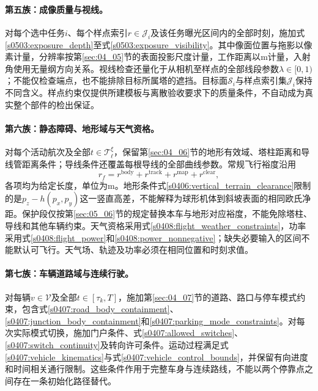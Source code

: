 \paragraph{第五族：成像质量与视线。}
对每个选中任务$i$、每个样点索引$r\in\mathcal J_i$及该任务曝光区间内的全部时刻，施加式\eqref{s0503:exposure_depth}至式\eqref{s0503:exposure_visibility}。其中像面位置与拖影以像素计量，分辨率按第\ref{sec:04_05}节的表面投影尺度计量，工作距离以$\mathrm m$计量，入射角使用无量纲方向关系。视线检查还量化于从相机至样点的全部线段参数$\lambda\in[0,1)$；不能仅检查端点，也不能排除目标所属塔的遮挡。目标面$\mathcal S_i$与样点索引集$\mathcal J_i$保持不同含义。样点约束仅提供所建模板与离散验收要求下的质量条件，不自动成为真实整个部件的检出保证。

\paragraph{第六族：静态障碍、地形域与天气资格。}
对每个活动航次及全部$t\in\mathcal T_\ell^\xi$，保留第\ref{sec:04_06}节的地形有效域、塔柱距离和导线管距离条件；导线条件还覆盖每根导线的全部曲线参数。常规飞行裕度沿用
\begin{equation}
 r_f=r^{\mathrm{body}}+r^{\mathrm{track}}
          +r^{\mathrm{map}}+r^{\mathrm{clear}},
 \label{s0508:margin_identity}
\end{equation}
各项均为给定长度，单位为$\mathrm m$。地形条件式\eqref{s0406:vertical_terrain_clearance}限制的是$p_z-h(p_x,p_y)$这一竖直高差，不能解释为球形机体到斜坡表面的相同欧氏净距。保护段仅按第\ref{sec:05_06}节的规定替换本车与地形对应裕度，不能免除塔柱、导线和其他车辆约束。天气资格采用式\eqref{s0408:flight_weather_constraints}，功率采用式\eqref{s0408:flight_power}和\eqref{s0408:power_nonnegative}；缺失必要输入的区间不能默认可飞行。天气场、轨迹及功率必须在相同位置和时刻求值。

\paragraph{第七族：车辆道路域与连续行驶。}
对每辆$v\in\mathcal V$及全部$t\in[\tau_k,T]$，施加第\ref{sec:04_07}节的道路、路口与停车模式约束，包含式\eqref{s0407:road_body_containment}、\eqref{s0407:junction_body_containment}和\eqref{s0407:parking_mode_constraints}。对每次实际模式切换，施加门户条件、式\eqref{s0407:allowed_switches}、\eqref{s0407:switch_continuity}及转向许可条件。运动过程满足式\eqref{s0407:vehicle_kinematics}与式\eqref{s0407:vehicle_control_bounds}，并保留有向进度和时间相关通行限制。这些条件作用于完整车身与连续路线，不能以两个停靠点之间存在一条初始化路径替代。

